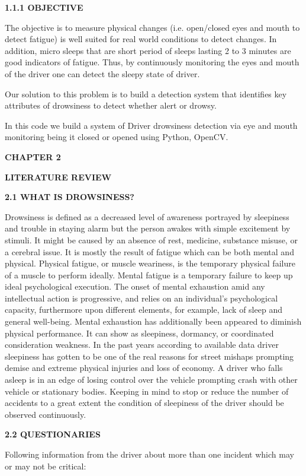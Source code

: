 \documentclass[a4paper,12pt]{article}
\begin{document}
\textbf{1.1.1 OBJECTIVE}

The objective is to measure physical changes (i.e. open/closed eyes and
mouth to detect fatigue) is well suited for real world conditions to
detect changes. In addition, micro sleeps that are short period of
sleeps lasting 2 to 3 minutes are good indicators of fatigue. Thus, by
continuously monitoring the eyes and mouth of the driver one can detect
the sleepy state of driver.

Our solution to this problem is to build a detection system that
identifies key attributes of drowsiness to detect whether alert or
drowsy.

In this code we build a system of Driver drowsiness detection via eye
and mouth monitoring being it closed or opened using Python, OpenCV.

\textbf{CHAPTER 2}

\textbf{LITERATURE REVIEW}

\textbf{2.1 WHAT IS DROWSINESS?}

Drowsiness is defined as a decreased level of awareness portrayed by
sleepiness and trouble in staying alarm but the person awakes with
simple excitement by stimuli. It might be caused by an absence of rest,
medicine, substance misuse, or a cerebral issue. It is mostly the result
of fatigue which can be both mental and physical. Physical fatigue, or
muscle weariness, is the temporary physical failure of a muscle to
perform ideally. Mental fatigue is a temporary failure to keep up ideal
psychological execution. The onset of mental exhaustion amid any
intellectual action is progressive, and relies on an individual's
psychological capacity, furthermore upon different elements, for
example, lack of sleep and general well-being. Mental exhaustion has
additionally been appeared to diminish physical performance. It can show
as sleepiness, dormancy, or coordinated consideration weakness. In the
past years according to available data driver sleepiness has gotten to
be one of the real reasons for street mishaps prompting demise and
extreme physical injuries and loss of economy. A driver who falls asleep
is in an edge of losing control over the vehicle prompting crash with
other vehicle or stationary bodies. Keeping in mind to stop or reduce
the number of accidents to a great extent the condition of sleepiness of
the driver should be observed continuously.

\textbf{2.2 QUESTIONARIES}

Following information from the driver about more than one incident which
may or may not be critical:
\end{document}
